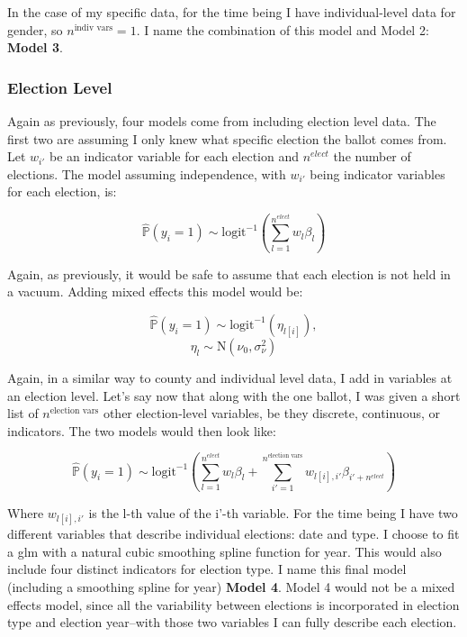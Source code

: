 \documentclass[12pt,twoside]{reedthesis}
\begin{document}
  In the case of my specific data, for the time being I have
  individual-level data for gender, so \(n^{\text{indiv vars}} = 1\). I
  name the combination of this model and Model 2: \textbf{Model 3}.
  
  \subsubsection{Election Level}\label{election-level}
  
  Again as previously, four models come from including election level
  data. The first two are assuming I only knew what specific election the
  ballot comes from. Let \(w_{i'}\) be an indicator variable for each
  election and \(n^{elect}\) the number of elections. The model assuming
  independence, with \(w_{i'}\) being indicator variables for each
  election, is:
  
  \[\hat{\mathbb{P}}(y_i = 1) \sim \text{logit}^{-1}(\sum_{l = 1}^{n^{elect}}w_{l}\beta_{l})\]
  
  Again, as previously, it would be safe to assume that each election is
  not held in a vacuum. Adding mixed effects this model would be:
  
  \[\hat{\mathbb{P}}(y_i = 1) \sim \text{logit}^{-1}(\eta_{l[i]}), \]
  \[\eta_{l} \sim \text{N}(\nu_0, \sigma_{\nu}^2)\]
  
  Again, in a similar way to county and individual level data, I add in
  variables at an election level. Let's say now that along with the one
  ballot, I was given a short list of \(n^{\text{election vars}}\) other
  election-level variables, be they discrete, continuous, or indicators.
  The two models would then look like:
  
  \begin{equation} \tag{Model 4}
  \hat{\mathbb{P}}(y_i = 1) \sim \text{logit}^{-1}(\sum_{l = 1}^{n^{elect}}w_{l}\beta_{l} + \sum_{i'=1}^{n^{\text{election vars}}}w_{l[i], i'}\beta_{i'+n^{elect}})
  \end{equation}
  
  Where \(w_{l[i], i'}\) is the l-th value of the i'-th variable. For the
  time being I have two different variables that describe individual
  elections: date and type. I choose to fit a glm with a natural cubic
  smoothing spline function for year. This would also include four
  distinct indicators for election type. I name this final model
  (including a smoothing spline for year) \textbf{Model 4}. Model 4 would
  not be a mixed effects model, since all the variability between
  elections is incorporated in election type and election year--with those
  two variables I can fully describe each election.
  
\end{document}
